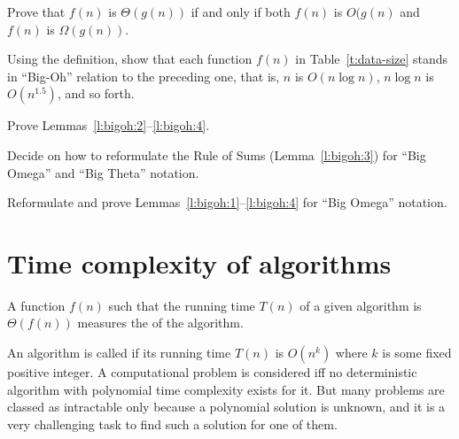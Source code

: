 \begin{Exercise}\label{exr:bigtheta}
Prove that $f(n)$ is $\Theta(g(n))$ if and only if both $f(n)$ is $O(g(n)$ and 
$f(n)$ is $\Omega(g(n))$.
\end{Exercise}

\begin{Exercise}
\label{exr:bigoh-order}
Using the definition, show that each function \(f(n)\) in 
Table~\ref{t:data-size} stands in ``Big-Oh'' relation to the preceding 
one, that is, \(n\) is \(O(n\log n)\), \(n\log n\) is \(O(n^{1.5})\),
and so forth. 

\end{Exercise}

\begin{Exercise}\label{exr:bigoh:features}
Prove Lemmas~\ref{l:bigoh:2}--\ref{l:bigoh:4}.
\end{Exercise}

\begin{Exercise}\label{exr:bigomega:sums}
Decide on how to reformulate the Rule of Sums (Lemma~\ref{l:bigoh:3})
for ``Big Omega'' and ``Big Theta'' notation.
\end{Exercise}

\begin{Exercise}\label{exr:bigomega:lem}
Reformulate and prove Lemmas~\ref{l:bigoh:1}--\ref{l:bigoh:4}
for ``Big Omega'' notation. 
\end{Exercise}

\section{Time complexity of algorithms} 
\label{time-compl}

\begin{Definition} [Informal]
A function $f(n)$ such that the running time $T(n)$ of a given 
algorithm is $\Theta(f(n))$ measures the  
of the algorithm.
\end{Definition}

An algorithm is called  if its running time $T(n)$
is $O(n^{k})$ where $k$ is some fixed positive integer. A computational
problem is considered  iff no deterministic
algorithm with polynomial time complexity exists for it. But many problems
are classed as intractable only because a polynomial solution is unknown,
and it is a very challenging task to find such a solution for one of them.
 
